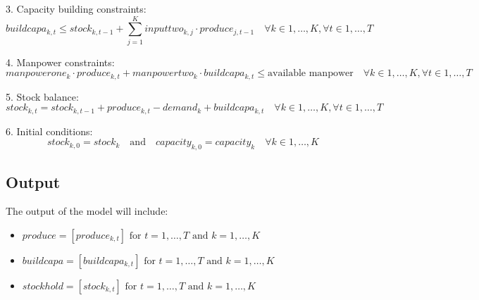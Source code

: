 \documentclass{article}
\begin{document}
3. Capacity building constraints:
\[
buildcapa_{k, t} \leq stock_{k, t-1} + \sum_{j=1}^{K} inputtwo_{k, j} \cdot produce_{j, t-1} \quad \forall k \in 1, \ldots, K, \forall t \in 1, \ldots, T
\]

4. Manpower constraints:
\[
manpowerone_k \cdot produce_{k, t} + manpowertwo_k \cdot buildcapa_{k, t} \leq \text{available manpower} \quad \forall k \in 1, \ldots, K, \forall t \in 1, \ldots, T
\]

5. Stock balance:
\[
stock_{k, t} = stock_{k, t-1} + produce_{k, t} - demand_k + buildcapa_{k, t} \quad \forall k \in 1, \ldots, K, \forall t \in 1, \ldots, T
\]

6. Initial conditions:
\[
stock_{k, 0} = stock_k \quad \text{and} \quad capacity_{k, 0} = capacity_k \quad \forall k \in 1, \ldots, K
\]

\subsection*{Output}
The output of the model will include:
\begin{itemize}
    \item $produce = [produce_{k, t}] \text{ for } t = 1, \ldots, T \text{ and } k = 1, \ldots, K$
    \item $buildcapa = [buildcapa_{k, t}] \text{ for } t = 1, \ldots, T \text{ and } k = 1, \ldots, K$
    \item $stockhold = [stock_{k, t}] \text{ for } t = 1, \ldots, T \text{ and } k = 1, \ldots, K$
\end{itemize}
\end{document}
